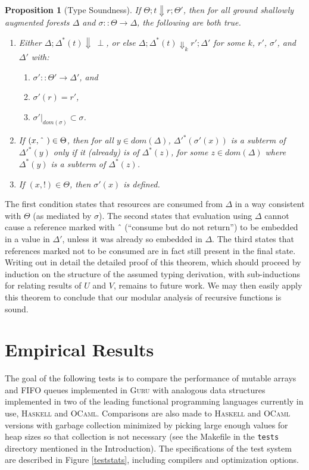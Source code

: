 \documentclass[9pt,natbib]{sigplanconf}
\newtheorem{proposition}{Proposition}
\begin{document}
\begin{proposition}[Type Soundness]
If $\Theta; t \Downarrow r; \Theta'$, then for all ground shallowly
augmented forests $\Delta$ and $\sigma::\Theta\to\Delta$, the
following are both true.
\begin{enumerate}
\item Either $\Delta; \Delta^*(t) \Downarrow\ \perp$, or else $\Delta;
  \Delta^*(t)\Downarrow_k r'; \Delta'$ for some $k$, $r'$, $\sigma'$, and
  $\Delta'$ with:
\begin{enumerate}
\item $\sigma'::\Theta'\to\Delta'$, and
\item $\sigma'(r) = r'$,
\item $\sigma'|_{\textit{dom}(\sigma)} \subset \sigma$.
\end{enumerate}
\item If $(x,\textnormal{\^{\ }})\in\Theta$, then for all
  $y\in\textit{dom}(\Delta)$, $\Delta'^*(\sigma'(x))$ is a
  subterm of $\Delta'^*(y)$ only if it (already) is of $\Delta^*(z)$,
  for some $z\in\textit{dom}(\Delta)$ where $\Delta^*(y)$ is a subterm
  of $\Delta^*(z)$.
\item If $(x,!)\in\Theta$, then $\sigma'(x)$ is defined.
\end{enumerate}
\end{proposition}

\noindent The first condition states that resources are consumed from
$\Delta$ in a way consistent with $\Theta$ (as mediated by $\sigma$).
The second states that evaluation using $\Delta$ cannot cause a
reference marked with \^{\ } (``consume but do not return'') to be
embedded in a value in $\Delta'$, unless it was already so embedded in
$\Delta$.  The third states that references marked not to be consumed
are in fact still present in the final state.  Writing out in detail
the detailed proof of this theorem, which should proceed by induction
on the structure of the assumed typing derivation, with sub-inductions
for relating results of $U$ and $V$, remains to future work.  We may
then easily apply this theorem to conclude that our modular analysis
of recursive functions is sound.

\section{Empirical Results}
\label{sec:emp}

The goal of the following tests is to compare the performance of
mutable arrays and FIFO queues implemented in \textsc{Guru} with
analogous data structures implemented in two of the leading functional
programming languages currently in use, \textsc{Haskell} and
\textsc{OCaml}.  Comparisons are also made to \textsc{Haskell} and
\textsc{OCaml} versions with garbage collection minimized by picking
large enough values for heap sizes so that collection is not necessary
(see the Makefile in the \texttt{tests} directory mentioned in the
Introduction).  The specifications of the test system are described in
Figure \ref{teststats}, including compilers and optimization options.
\end{document}
